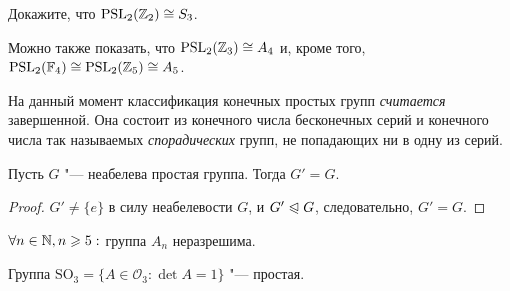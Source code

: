 \begin{exercise}
	Докажите, что $\operatorname{PSL}_2(\mathbb{Z}_2) \cong S_3$.
\end{exercise}

\begin{note}
	Можно также показать, что $\operatorname{PSL}_2(\mathbb{Z}_3) \cong A_4$ и, кроме того, $\operatorname{PSL}_2(\mathbb{F}_4) \cong \operatorname{PSL}_2(\mathbb{Z}_5) \cong A_5$.
\end{note}

\begin{note}
	На данный момент классификация конечных простых групп \textit{считается} завершенной. Она состоит из конечного числа бесконечных серий и конечного числа так называемых \textit{спорадических} групп, не попадающих ни в одну из серий.
\end{note}

\begin{proposition}
	Пусть $G$ "--- неабелева простая группа. Тогда $G' = G$.
\end{proposition}

\begin{proof}
	$G' \ne \{e\}$ в силу неабелевости $G$, и $G' \trianglelefteqslant G$, следовательно, $G' = G$.
\end{proof}

\begin{corollary}
	$\forall n \in \mathbb{N}, n \geqslant 5:$ группа $A_n$ неразрешима.
\end{corollary}

\begin{theorem}
	Группа $\mathrm{SO}_3 = \{A \in \mathcal{O}_3: \det{A} = 1\}$ "--- простая.
\end{theorem}


